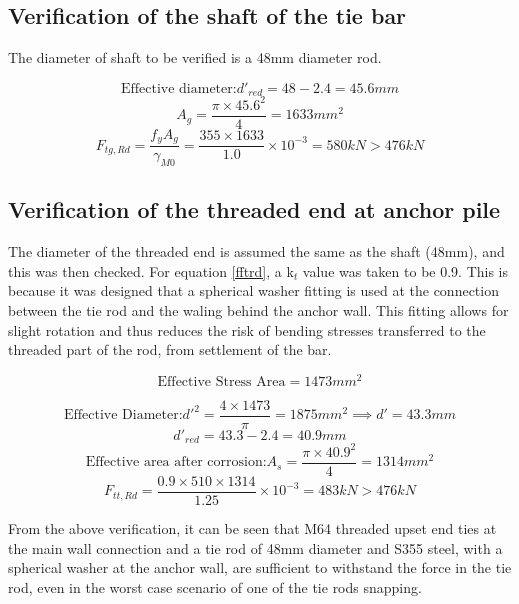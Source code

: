 \documentclass[12pt, a4paper]{article}
\begin{document}
\subsection{Verification of the shaft of the tie bar}
\begin{justify}
The diameter of shaft to be verified is a 48mm diameter rod.
\end{justify}
\begin{equation}
    \text{Effective diameter:}d'_{red}=48-2.4=45.6mm
\end{equation}
\begin{equation}
    A_g=\frac{\pi\times45.6^2}{4}=1633mm^2
\end{equation}
\begin{equation}
    F_{tg,Rd}=\frac{f_yA_g}{\gamma_{M0}}=\frac{355\times1633}{1.0}\times10^{-3}=580kN>476kN
\end{equation}
\subsection{Verification of the threaded end at anchor pile}
\begin{justify}
The diameter of the threaded end is assumed the same as the shaft (48mm), and this was then checked. For equation \ref{fftrd}, a k$_t$ value was taken to be 0.9. This is because it was designed that a spherical washer fitting is used at the connection between the tie rod and the waling behind the anchor wall. This fitting allows for slight rotation and thus reduces the risk of bending stresses transferred to the threaded part of the rod, from settlement of the bar.
\end{justify}
\begin{equation}
    \text{Effective Stress Area}=1473mm^2
\end{equation}

\begin{equation}
    \text{Effective Diameter:}d'^2=\frac{4\times1473}{\pi}=1875mm^2\implies d'=43.3mm
\end{equation}
\begin{equation}
    d'_{red}=43.3-2.4=40.9mm
\end{equation}
\begin{equation}
    \text{Effective area after corrosion:}A_s=\frac{\pi \times 40.9^2}{4}=1314mm^2
\end{equation}
\begin{equation}
    F_{tt,Rd}=\frac{0.9\times 510 \times 1314}{1.25}\times10^{-3}=483kN>476kN
    \label{fftrd}
\end{equation}
\begin{justify}
From the above verification, it can be seen that M64 threaded upset end ties at the main wall connection and a tie rod of 48mm diameter and S355 steel, with a spherical washer at the anchor wall, are sufficient to withstand the force in the tie rod, even in the worst case scenario of one of the tie rods snapping.
\end{justify}
\end{document}
